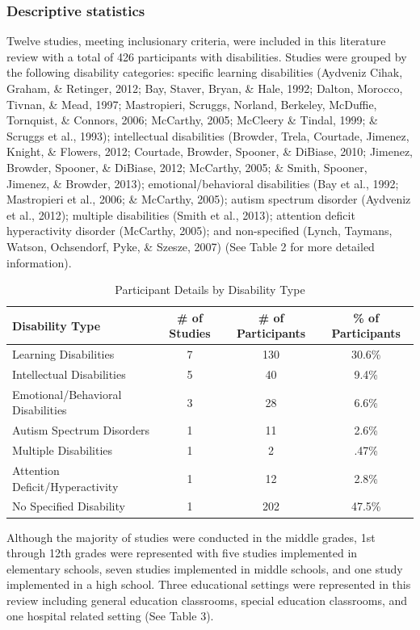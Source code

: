 \documentclass[11.5pt]{sig-alternate} %
\begin{document}
\begin{large}
\subsubsection*{Descriptive statistics}
Twelve studies, meeting inclusionary criteria, were included in this literature review with a total of 426 participants with disabilities. Studies were grouped by the following disability categories:  specific learning disabilities (Aydveniz Cihak, Graham, \& Retinger, 2012; Bay, Staver, Bryan, \& Hale, 1992; Dalton, Morocco, Tivnan, \& Mead, 1997; Mastropieri, Scruggs, Norland, Berkeley, McDuffie, Tornquist, \& Connors, 2006; McCarthy, 2005; McCleery \& Tindal, 1999; \& Scruggs et al., 1993);  intellectual disabilities (Browder, Trela, Courtade, Jimenez, Knight, \& Flowers, 2012; Courtade, Browder, Spooner, \& DiBiase, 2010; Jimenez, Browder, Spooner, \& DiBiase, 2012; McCarthy, 2005; \& Smith, Spooner, Jimenez, \& Browder, 2013);  emotional/behavioral disabilities (Bay et al., 1992; Mastropieri et al., 2006; \& McCarthy, 2005);  autism spectrum disorder (Aydveniz et al., 2012);  multiple disabilities (Smith et al., 2013); attention deficit hyperactivity disorder (McCarthy, 2005); and non-specified (Lynch, Taymans, Watson, Ochsendorf, Pyke, \& Szesze, 2007) (See Table 2 for more detailed information).  

\begin{table}[htp]
\caption{Participant Details by Disability Type}
\begin{tabular}{lccc}
\hline
Disability Type & \# of Studies & \# of Participants & \% of Participants \\ \hline
Learning Disabilities & 7 & 130 & 30.6\% \\ \hline
Intellectual Disabilities & 5 & 40 & 9.4\% \\ \hline
Emotional/Behavioral Disabilities & 3 & 28 & 6.6\% \\ \hline
Autism Spectrum Disorders & 1 & 11 & 2.6\% \\ \hline
Multiple Disabilities & 1 & 2 & .47\% \\ \hline
Attention Deficit/Hyperactivity & 1 & 12 & 2.8\% \\ \hline
No Specified Disability & 1 & 202 & 47.5\% \\ \hline
\end{tabular}
\end{table}

Although the majority of studies were conducted in the middle grades, 1st through 12th grades were represented with five studies implemented in elementary schools, seven studies implemented in middle schools, and one study implemented in a high school.  Three educational settings were represented in this review including general education classrooms, special education classrooms, and one hospital related setting (See Table 3).


\end{large}
\end{document}
